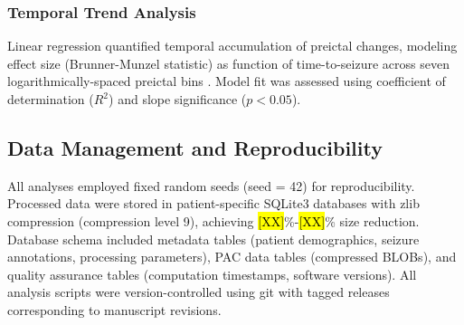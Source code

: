 \subsubsection{Temporal Trend Analysis}
Linear regression quantified temporal accumulation of preictal changes, modeling effect size (Brunner-Munzel statistic) as function of time-to-seizure across seven logarithmically-spaced preictal bins \cite{Kuhlmann2018SeizurePA}. Model fit was assessed using coefficient of determination ($R^2$) and slope significance ($p < 0.05$).

\subsection{Data Management and Reproducibility}
All analyses employed fixed random seeds (seed = 42) for reproducibility. Processed data were stored in patient-specific SQLite3 databases with zlib compression (compression level 9), achieving \hl{[XX]}\%-\hl{[XX]}\% size reduction. Database schema included metadata tables (patient demographics, seizure annotations, processing parameters), PAC data tables (compressed BLOBs), and quality assurance tables (computation timestamps, software versions). All analysis scripts were version-controlled using git with tagged releases corresponding to manuscript revisions.

